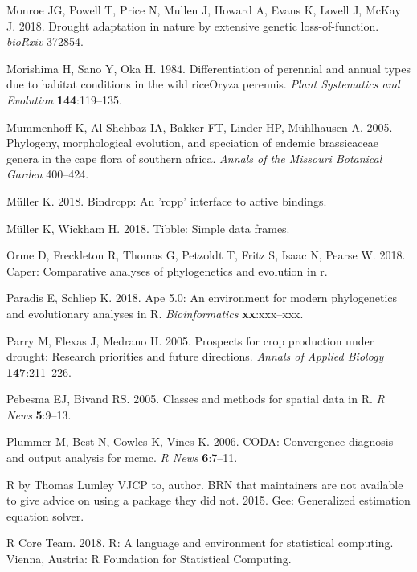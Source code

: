 \documentclass[man,floatsintext]{apa6}
\theoremstyle{definition}
\theoremstyle{definition}
\theoremstyle{definition}
\theoremstyle{remark}
\begin{document}
\leavevmode\hypertarget{ref-monroe2018drought}{}%
Monroe JG, Powell T, Price N, Mullen J, Howard A, Evans K, Lovell J,
McKay J. 2018. Drought adaptation in nature by extensive genetic
loss-of-function. \emph{bioRxiv} 372854.

\leavevmode\hypertarget{ref-morishima1984differentiation}{}%
Morishima H, Sano Y, Oka H. 1984. Differentiation of perennial and
annual types due to habitat conditions in the wild riceOryza perennis.
\emph{Plant Systematics and Evolution} \textbf{144}:119--135.

\leavevmode\hypertarget{ref-mummenhoff2005phylogeny}{}%
Mummenhoff K, Al-Shehbaz IA, Bakker FT, Linder HP, Mühlhausen A. 2005.
Phylogeny, morphological evolution, and speciation of endemic
brassicaceae genera in the cape flora of southern africa. \emph{Annals
of the Missouri Botanical Garden} 400--424.

\leavevmode\hypertarget{ref-R-bindrcpp}{}%
Müller K. 2018. Bindrcpp: An 'rcpp' interface to active bindings.

\leavevmode\hypertarget{ref-R-tibble}{}%
Müller K, Wickham H. 2018. Tibble: Simple data frames.

\leavevmode\hypertarget{ref-R-caper}{}%
Orme D, Freckleton R, Thomas G, Petzoldt T, Fritz S, Isaac N, Pearse W.
2018. Caper: Comparative analyses of phylogenetics and evolution in r.

\leavevmode\hypertarget{ref-R-ape}{}%
Paradis E, Schliep K. 2018. Ape 5.0: An environment for modern
phylogenetics and evolutionary analyses in R. \emph{Bioinformatics}
\textbf{xx}:xxx--xxx.

\leavevmode\hypertarget{ref-parry2005prospects}{}%
Parry M, Flexas J, Medrano H. 2005. Prospects for crop production under
drought: Research priorities and future directions. \emph{Annals of
Applied Biology} \textbf{147}:211--226.

\leavevmode\hypertarget{ref-R-sp}{}%
Pebesma EJ, Bivand RS. 2005. Classes and methods for spatial data in R.
\emph{R News} \textbf{5}:9--13.

\leavevmode\hypertarget{ref-R-coda}{}%
Plummer M, Best N, Cowles K, Vines K. 2006. CODA: Convergence diagnosis
and output analysis for mcmc. \emph{R News} \textbf{6}:7--11.

\leavevmode\hypertarget{ref-R-gee}{}%
R by Thomas Lumley VJCP to, author. BRN that maintainers are not
available to give advice on using a package they did not. 2015. Gee:
Generalized estimation equation solver.

\leavevmode\hypertarget{ref-R-base}{}%
R Core Team. 2018. R: A language and environment for statistical
computing. Vienna, Austria: R Foundation for Statistical Computing.
\end{document}
